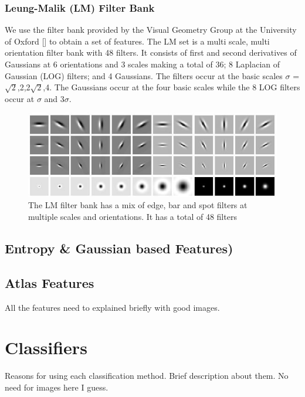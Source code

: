 \documentclass{article} %
\begin{document}
\subsubsection{Leung-Malik (LM) Filter Bank}
We use the filter bank provided by the Visual Geometry Group at the University of Oxford [] to obtain a set of features. The LM set is a multi scale, multi orientation filter bank with 48 filters. It consists of first and second derivatives of Gaussians at 6 orientations and 3 scales making a total of 36; 8 Laplacian of Gaussian (LOG) filters; and 4 Gaussians. The filters occur at the basic scales $\sigma$ = {$\sqrt{2}$,2,2$\sqrt{2}$,4}. The Gaussians occur at the four basic scales while the 8 LOG filters occur at $\sigma$ and 3$\sigma$.

\begin{figure}[h]
\centering
\includegraphics[scale=0.5]{lmfilters}
\caption{The LM filter bank has a mix of edge, bar and spot filters at multiple scales and orientations. It has a total of 48 filters}
\label{fig:LM filters}
\end{figure}

\subsection{Entropy \& Gaussian based Features)}

\subsection{Atlas Features}

All the features need to explained briefly with good images.

\section{Classifiers}

Reasons for using each classification method. Brief description about them. No need for images here I guess.  
\end{document}
